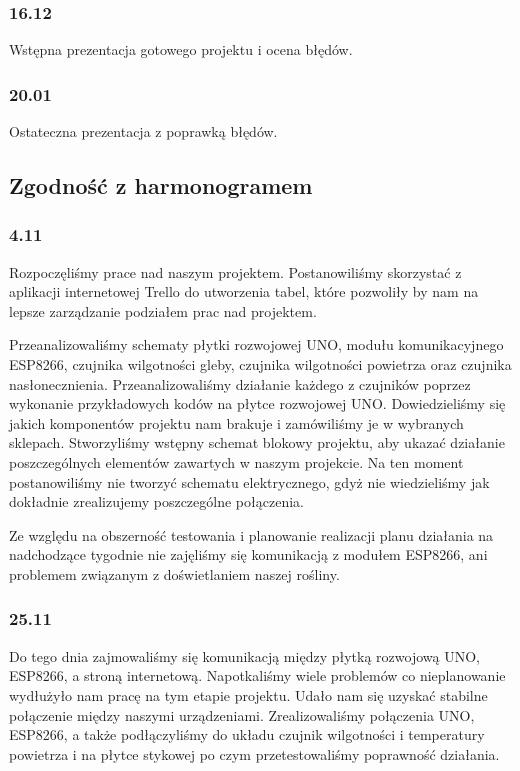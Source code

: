 \documentclass[12pt]{article}
\begin{document}
\subsubsection{16.12}
Wstępna prezentacja gotowego projektu i ocena błędów.

\subsubsection{20.01}
Ostateczna prezentacja z poprawką błędów.



\subsection{Zgodność z harmonogramem}
\subsubsection{4.11}
Rozpoczęliśmy prace nad naszym projektem. Postanowiliśmy skorzystać z aplikacji internetowej Trello do utworzenia tabel, które pozwoliły by nam na lepsze zarządzanie podziałem prac nad projektem.

Przeanalizowaliśmy schematy płytki rozwojowej UNO, modułu komunikacyjnego ESP8266, czujnika wilgotności gleby, czujnika wilgotności powietrza oraz czujnika nasłonecznienia. Przeanalizowaliśmy działanie każdego z czujników poprzez wykonanie przykładowych kodów na płytce rozwojowej UNO. Dowiedzieliśmy się jakich komponentów projektu nam brakuje i zamówiliśmy je w wybranych sklepach.
Stworzyliśmy wstępny schemat blokowy projektu, aby ukazać działanie poszczególnych elementów zawartych w naszym projekcie. Na ten moment postanowiliśmy nie tworzyć schematu elektrycznego, gdyż nie wiedzieliśmy jak dokładnie zrealizujemy poszczególne połączenia.

Ze względu na obszerność testowania i planowanie realizacji planu działania na nadchodzące tygodnie nie zajęliśmy się komunikacją z modułem ESP8266, ani problemem związanym z doświetlaniem naszej rośliny.


\subsubsection{25.11}
Do tego dnia zajmowaliśmy się komunikacją między płytką rozwojową UNO, ESP8266, a stroną internetową. Napotkaliśmy wiele problemów co nieplanowanie wydłużyło nam pracę na tym etapie projektu. Udało nam się uzyskać stabilne połączenie między naszymi urządzeniami. Zrealizowaliśmy połączenia UNO, ESP8266, a także podłączyliśmy do układu czujnik wilgotności i temperatury powietrza i na płytce stykowej po czym przetestowaliśmy poprawność działania. 
\end{document}
